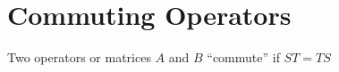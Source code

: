 \section{Commuting Operators}
\begin{mydef}
  Two operators or matrices $A$ and $B$ ``commute'' if $ST=TS$
\end{mydef}
